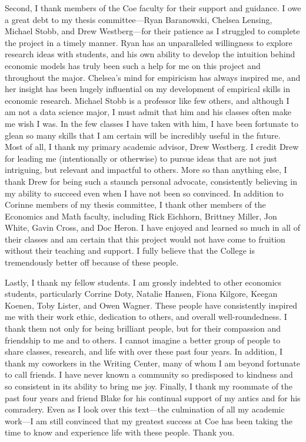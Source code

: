 Second, I thank members of the Coe faculty for their support and guidance. I owe a great debt to my thesis committee---Ryan Baranowski, Chelsea Lensing, Michael Stobb, and Drew Westberg---for their patience as I struggled to complete the project in a timely manner. Ryan has an unparalleled willingness to explore research ideas with students, and his own ability to develop the intuition behind economic models has truly been such a help for me on this project and throughout the major. Chelsea's mind for empiricism has always inspired me, and her insight  has been hugely influential on my development of empirical skills in economic research. Michael Stobb is a professor like few others, and although I am not a data science major, I must admit that him and his classes often make me wish I was. In the few classes I have taken with him, I have been fortunate to glean so many skills that I am certain will be incredibly useful in the future. Most of all, I thank my primary academic advisor, Drew Westberg. I credit Drew for leading me (intentionally or otherwise) to pursue ideas that are not just intriguing, but relevant and impactful to others. More so than anything else, I thank Drew for being such a staunch personal advocate, consistently believing in my ability to succeed even when I have not been so convinced. In addition to Corinne members of my thesis committee, I thank other members of the Economics and Math faculty, including Rick Eichhorn, Brittney Miller, Jon White, Gavin Cross, and Doc Heron. I have enjoyed and learned so much in all of their classes and am certain that this project would not have come to fruition without their teaching and support. I fully believe that the College is tremendously better off because of these people.

Lastly, I thank my fellow students. I am grossly indebted to other economics students, particularly Corrine Doty, Natalie Hansen, Fiona Kilgore, Keegan Koenen, Toby Lister, and Owen Wagner. These people have consistently inspired me with their work ethic, dedication to others, and overall well-roundedness. I thank them not only for being brilliant people, but for their compassion and friendship to me and to others. I cannot imagine a better group of people to share classes, research, and life with over these past four years. In addition, I thank my coworkers in the Writing Center, many of whom I am beyond fortunate to call friends. I have never known a community so predisposed to kindness and so consistent in its ability to bring me joy.  Finally, I thank my roommate of the past four years and friend Blake for his continual support of my antics and for his comradery. Even as I look over this text---the culmination of all my academic work---I am still convinced that my greatest success at Coe has been taking the time to know and experience life with these people. Thank you.


